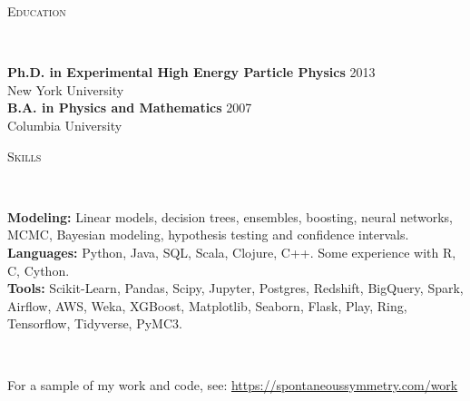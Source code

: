\documentclass[9pt]{article}
\newenvironment{changemargin}[2]{%
  \begin{list}{}{%
    \setlength{\topsep}{0pt}%
    \setlength{\leftmargin}{#1}%
    \setlength{\rightmargin}{#2}%
    \setlength{\listparindent}{\parindent}%
    \setlength{\itemindent}{\parindent}%
    \setlength{\parsep}{\parskip}%
  }%
  \item[]}{\end{list}
}
\newcommand{\lineover}{
  \begin{changemargin}{-0.05in}{-0.05in}
    \vspace*{-8pt}
    \hrulefill \\
    \vspace*{-2pt}
  \end{changemargin}
}
\newcommand{\header}[1]{
  \begin{changemargin}{-0.5in}{-0.5in}
    \scshape{#1}
    \lineover
  \end{changemargin}
}
\newenvironment{body} {
  \vspace*{-16pt}
\begin{changemargin}{-0.25in}{-0.5in}
  }
{\end{changemargin}
}
\begin{document}
\header{Education}

\begin{body}
  \vspace{14pt}
  \textbf{Ph.D. in Experimental High Energy Particle Physics }{} \hfill 2013{} \\
  New York University \\
  \medskip
  \textbf{B.A. in Physics and Mathematics} \hfill 2007 \\
  Columbia University\\
\end{body}

\header{Skills}
\begin{body}
  \vspace{14pt}
  \textbf{Modeling:}{} Linear models, decision trees, ensembles, boosting, neural networks, MCMC, Bayesian modeling, hypothesis testing and confidence intervals. \\
  \textbf{Languages:}{} Python, Java, SQL, Scala, Clojure, C++.  Some experience with R, C, Cython. \\
  \textbf{Tools:}{} Scikit-Learn, Pandas, Scipy, Jupyter, Postgres, Redshift, BigQuery, Spark, Airflow, AWS, Weka, XGBoost, Matplotlib, Seaborn, Flask, Play, Ring, Tensorflow, Tidyverse, PyMC3. \\
\end{body}

\smallskip


\header{}
\begin{body}
  \vspace{14pt}
  For a sample of my work and code, see: {\url{https://spontaneoussymmetry.com/work}}
\end{body}
\end{document}
